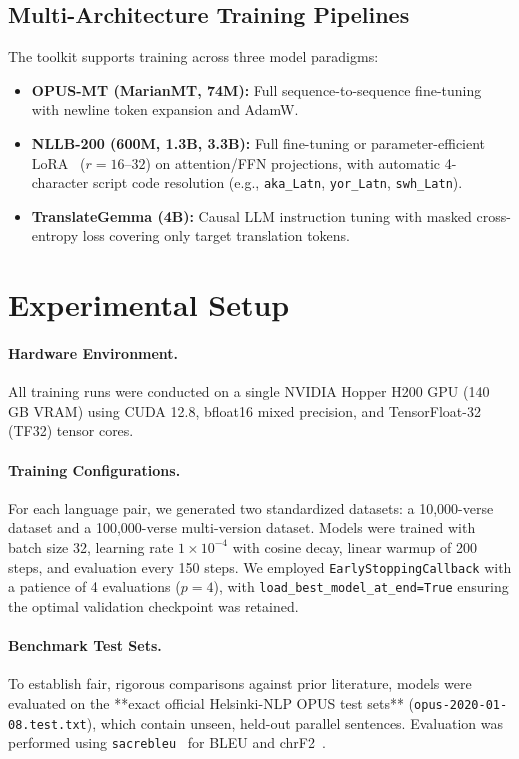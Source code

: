 \documentclass[10pt,twocolumn]{article}
\begin{document}
\subsection{Multi-Architecture Training Pipelines}
The toolkit supports training across three model paradigms:
\begin{itemize}
    \item \textbf{OPUS-MT (MarianMT, 74M):} Full sequence-to-sequence fine-tuning with newline token expansion and AdamW.
    \item \textbf{NLLB-200 (600M, 1.3B, 3.3B):} Full fine-tuning or parameter-efficient LoRA~\cite{hu2022lora} ($r=16$--$32$) on attention/FFN projections, with automatic 4-character script code resolution (e.g., \texttt{aka\_Latn}, \texttt{yor\_Latn}, \texttt{swh\_Latn}).
    \item \textbf{TranslateGemma (4B):} Causal LLM instruction tuning with masked cross-entropy loss covering only target translation tokens.
\end{itemize}

\section{Experimental Setup}

\paragraph{Hardware Environment.} All training runs were conducted on a single NVIDIA Hopper H200 GPU (140 GB VRAM) using CUDA 12.8, bfloat16 mixed precision, and TensorFloat-32 (TF32) tensor cores.

\paragraph{Training Configurations.} For each language pair, we generated two standardized datasets: a 10,000-verse dataset and a 100,000-verse multi-version dataset. Models were trained with batch size 32, learning rate $1 \times 10^{-4}$ with cosine decay, linear warmup of 200 steps, and evaluation every 150 steps. We employed \texttt{EarlyStoppingCallback} with a patience of 4 evaluations ($p=4$), with \texttt{load\_best\_model\_at\_end=True} ensuring the optimal validation checkpoint was retained.

\paragraph{Benchmark Test Sets.} To establish fair, rigorous comparisons against prior literature, models were evaluated on the **exact official Helsinki-NLP OPUS test sets** (\texttt{opus-2020-01-08.test.txt}), which contain unseen, held-out parallel sentences. Evaluation was performed using \texttt{sacrebleu}~\cite{post2018call} for BLEU and chrF2~\cite{popovic2015chrf}.
\end{document}
